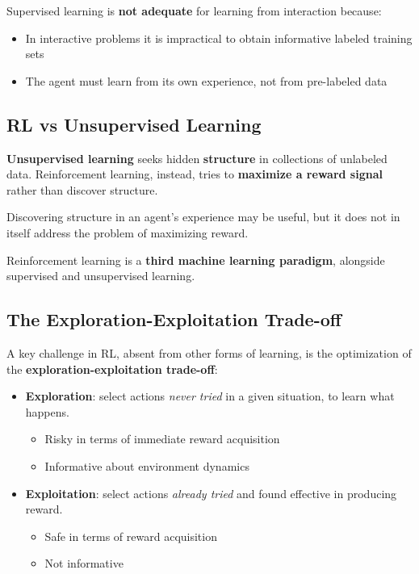 \documentclass[11pt,a4paper]{article}
\theoremstyle{definition}
\theoremstyle{plain}
\theoremstyle{remark}
\begin{document}
Supervised learning is \textbf{not adequate} for learning from interaction because:
\begin{itemize}
    \item In interactive problems it is impractical to obtain informative labeled training sets
    \item The agent must learn from its own experience, not from pre-labeled data
\end{itemize}

\subsection{RL vs Unsupervised Learning}

\textbf{Unsupervised learning} seeks hidden \textbf{structure} in collections of unlabeled data. Reinforcement learning, instead, tries to \textbf{maximize a reward signal} rather than discover structure.

Discovering structure in an agent's experience may be useful, but it does not in itself address the problem of maximizing reward.

\begin{tcolorbox}[colback=green!5!white,colframe=green!60!black]
\centering
Reinforcement learning is a \textbf{third machine learning paradigm}, alongside supervised and unsupervised learning.
\end{tcolorbox}

\subsection{The Exploration-Exploitation Trade-off}

A key challenge in RL, absent from other forms of learning, is the optimization of the \textbf{exploration-exploitation trade-off}:

\begin{itemize}
    \item \textbf{Exploration}: select actions \textit{never tried} in a given situation, to learn what happens.
    \begin{itemize}
        \item Risky in terms of immediate reward acquisition
        \item Informative about environment dynamics
    \end{itemize}
    \item \textbf{Exploitation}: select actions \textit{already tried} and found effective in producing reward.
    \begin{itemize}
        \item Safe in terms of reward acquisition
        \item Not informative
    \end{itemize}
\end{itemize}
\end{document}
